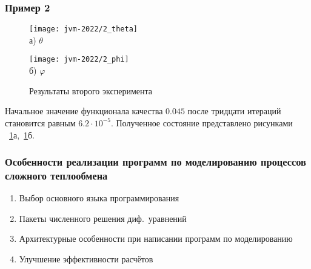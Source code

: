\begin{frame}
    \frametitle{Пример 2}
    \begin{figure}[h!t]
        \begin{minipage}[b][][b]{0.49\linewidth}
            \centering
            \texttt{[image: jvm-2022/2\_theta]}
            \\ а) $\theta$
        \end{minipage}
        \hfill
        \begin{minipage}[b][][b]{0.49\linewidth}
            \centering
            \texttt{[image: jvm-2022/2\_phi]}
            \\ б) $\varphi$
        \end{minipage}
        \caption{Результаты второго эксперимента}
        \label{fig:4_4:6}
    \end{figure}
    Начальное значение функционала качества $0.045$
    после тридцати итераций становится равным $6.2\cdot10^{-5}$.
    Полученное состояние представлено рисунками ~\ref{fig:4_4:6}а,~\ref{fig:4_4:6}б.

\end{frame}


\begin{frame}
    \frametitle{Особенности реализации программ по моделированию процессов сложного теплообмена}
    \begin{enumerate}
        \item Выбор основного языка программирования
        \item Пакеты численного решения диф.\ уравнений
        \item Архитектурные особенности при написании программ по моделированию
        \item Улучшение эффективности расчётов
    \end{enumerate}
\end{frame}
